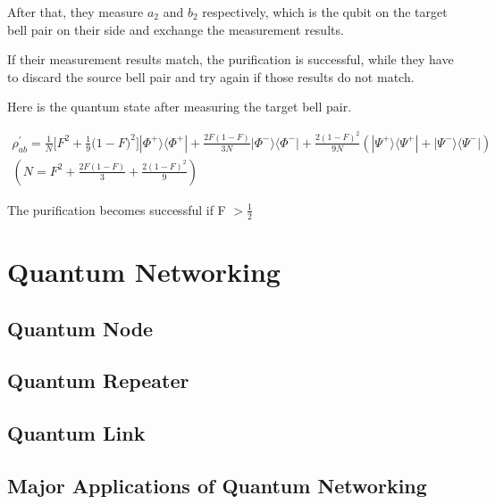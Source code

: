 After that, they measure $a_2$ and $b_2$ respectively, which is the qubit on the target bell pair on their side and exchange the measurement results.  

If their measurement results match, the purification is successful, while they have to discard the source bell pair and try again if those results do not match.

Here is the quantum state after measuring the target bell pair.

\begin{multline*}
\rho^{'}_{ab} = \frac{1}{N} \big[ F^2 + \frac{1}{9}\big(1-F \big)^2\big]|\Phi^+\rangle\langle\Phi^+| + \frac{2F(1-F)}{3N}|\Phi^-\rangle\langle\Phi^-| + \frac{2(1-F)^2}{9N}(|\Psi^+\rangle\langle\Psi^+| + |\Psi^-\rangle\langle\Psi^-|) \\
(N = F^2 + \frac{2F(1-F)}{3} + \frac{2(1-F)^2}{9})
\end{multline*}

The purification becomes successful if F  $> \frac{1}{2}$

\section{Quantum Networking}
\subsection{Quantum Node}
\subsection{Quantum Repeater}
\subsection{Quantum Link}
\subsection{Major Applications of Quantum Networking}

